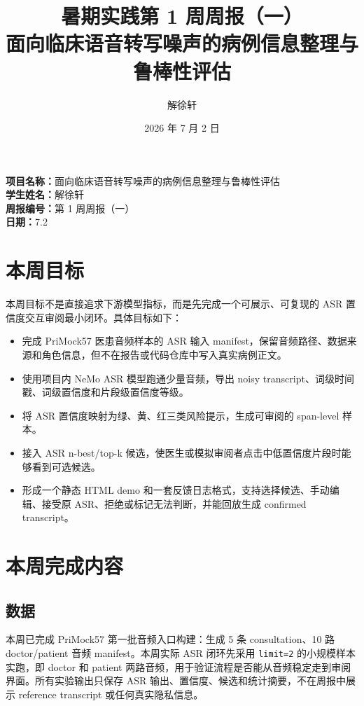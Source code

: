\documentclass[UTF8,a4paper,12pt]{ctexart}
\title{\textbf{暑期实践第 1 周周报（一）}\\
\large 面向临床语音转写噪声的病例信息整理与鲁棒性评估}
\author{解徐轩}
\date{2026 年 7 月 2 日}
\begin{document}
\maketitle

\noindent\textbf{项目名称：}面向临床语音转写噪声的病例信息整理与鲁棒性评估\\
\textbf{学生姓名：}解徐轩\\
\textbf{周报编号：}第 1 周周报（一）\\
\textbf{日期：}7.2

\section{本周目标}

本周目标不是直接追求下游模型指标，而是先完成一个可展示、可复现的 ASR 置信度交互审阅最小闭环。具体目标如下：

\begin{itemize}
  \item 完成 PriMock57 医患音频样本的 ASR 输入 manifest，保留音频路径、数据来源和角色信息，但不在报告或代码仓库中写入真实病例正文。
  \item 使用项目内 NeMo ASR 模型跑通少量音频，导出 noisy transcript、词级时间戳、词级置信度和片段级置信度等级。
  \item 将 ASR 置信度映射为绿、黄、红三类风险提示，生成可审阅的 span-level 样本。
  \item 接入 ASR n-best/top-k 候选，使医生或模拟审阅者点击中低置信度片段时能够看到可选候选。
  \item 形成一个静态 HTML demo 和一套反馈日志格式，支持选择候选、手动编辑、接受原 ASR、拒绝或标记无法判断，并能回放生成 confirmed transcript。
\end{itemize}

\section{本周完成内容}

\subsection*{数据}

本周已完成 PriMock57 第一批音频入口构建：生成 5 条 consultation、10 路 doctor/patient 音频 manifest。本周实际 ASR 闭环先采用 \texttt{limit=2} 的小规模样本实跑，即 doctor 和 patient 两路音频，用于验证流程是否能从音频稳定走到审阅界面。所有实验输出只保存 ASR 输出、置信度、候选和统计摘要，不在周报中展示 reference transcript 或任何真实隐私信息。
\end{document}
